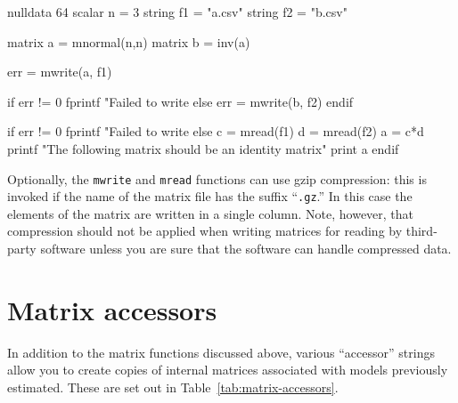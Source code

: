 \begin{script}[htbp]
  \label{matrix-rw}
  \begin{scode}
nulldata 64
scalar n = 3
string f1 = "a.csv"
string f2 = "b.csv"

matrix a = mnormal(n,n)
matrix b = inv(a)

err = mwrite(a, f1)

if err != 0
  fprintf "Failed to write %
else
  err = mwrite(b, f2)
endif 

if err != 0
  fprintf "Failed to write %
else
  c = mread(f1)
  d = mread(f2)
  a = c*d
  printf "The following matrix should be an identity matrix\n"
  print a
endif
  \end{scode}
\end{script}

Optionally, the \texttt{mwrite} and \texttt{mread} functions can use
gzip compression: this is invoked if the name of the matrix file has
the suffix ``\texttt{.gz}.'' In this case the elements of the matrix
are written in a single column. Note, however, that compression should
not be applied when writing matrices for reading by third-party
software unless you are sure that the software can handle compressed
data.

\section{Matrix accessors}
\label{matrix-accessors}

In addition to the matrix functions discussed above,
various ``accessor'' strings allow you to create copies of internal
matrices associated with models previously estimated.
These are set out in Table~\ref{tab:matrix-accessors}.

